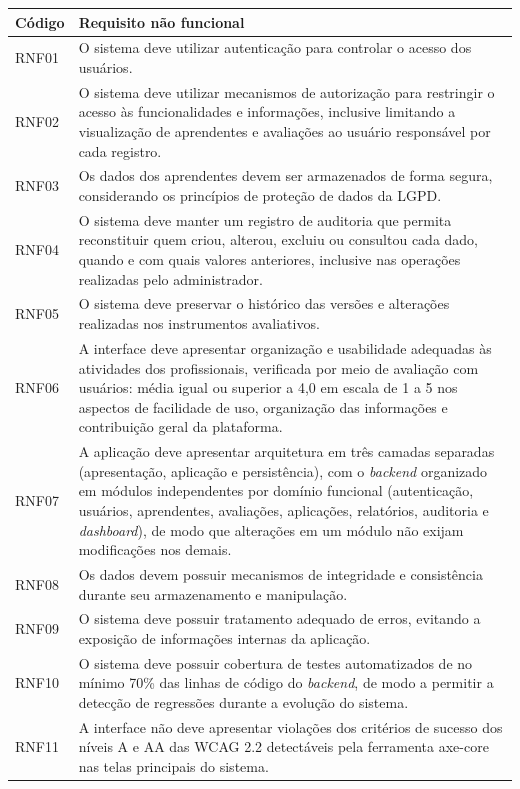 \begin{quadro}[H]
\centering
\footnotesize
\caption{Requisitos não funcionais}
\begin{tabular}{|p{1.6cm}|p{13cm}|}
\hline
\textbf{Código} & \textbf{Requisito não funcional} \\
\hline
RNF01 & O sistema deve utilizar autenticação para controlar o acesso dos usuários. \\ \hline
RNF02 & O sistema deve utilizar mecanismos de autorização para restringir o acesso às funcionalidades e informações, inclusive limitando a visualização de aprendentes e avaliações ao usuário responsável por cada registro. \\ \hline
RNF03 & Os dados dos aprendentes devem ser armazenados de forma segura, considerando os princípios de proteção de dados da LGPD. \\ \hline
RNF04 & O sistema deve manter um registro de auditoria que permita reconstituir quem criou, alterou, excluiu ou consultou cada dado, quando e com quais valores anteriores, inclusive nas operações realizadas pelo administrador. \\ \hline
RNF05 & O sistema deve preservar o histórico das versões e alterações realizadas nos instrumentos avaliativos. \\ \hline
RNF06 & A interface deve apresentar organização e usabilidade adequadas às atividades dos profissionais, verificada por meio de avaliação com usuários: média igual ou superior a 4,0 em escala de 1 a 5 nos aspectos de facilidade de uso, organização das informações e contribuição geral da plataforma. \\ \hline
RNF07 & A aplicação deve apresentar arquitetura em três camadas separadas (apresentação, aplicação e persistência), com o \textit{backend} organizado em módulos independentes por domínio funcional (autenticação, usuários, aprendentes, avaliações, aplicações, relatórios, auditoria e \textit{dashboard}), de modo que alterações em um módulo não exijam modificações nos demais. \\ \hline
RNF08 & Os dados devem possuir mecanismos de integridade e consistência durante seu armazenamento e manipulação. \\ \hline
RNF09 & O sistema deve possuir tratamento adequado de erros, evitando a exposição de informações internas da aplicação. \\ \hline
RNF10 & O sistema deve possuir cobertura de testes automatizados de no mínimo 70\% das linhas de código do \textit{backend}, de modo a permitir a detecção de regressões durante a evolução do sistema. \\ \hline
RNF11 & A interface não deve apresentar violações dos critérios de sucesso dos níveis A e AA das WCAG 2.2 detectáveis pela ferramenta axe-core nas telas principais do sistema. \\ \hline
\end{tabular}
\label{qua:requisitos_nao_funcionais}
\end{quadro}

